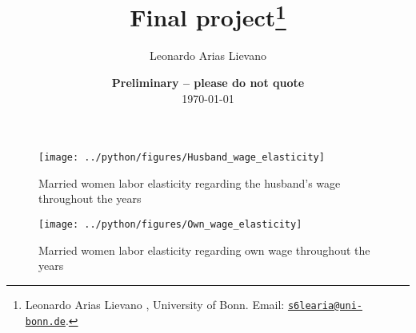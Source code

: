 \documentclass{article}
\begin{document}
\title{Final project\thanks{Leonardo Arias Lievano , University of Bonn. Email: \href{mailto:s6learia@uni-bonn.de}{\nolinkurl{s6learia@uni-bonn.de}}.}}

\author{Leonardo Arias Lievano }

\date{
    {\bf Preliminary -- please do not quote}
    \\[1ex]
    \today
}

\maketitle

\begin{table}
    
\end{table}

\begin{figure}

    \centering
    \texttt{[image: ../python/figures/Husband\_wage\_elasticity]}

    \caption{Married women labor elasticity regarding the husband's wage
    throughout the years}
    \label{fig:husband_wage}

\end{figure}

\begin{figure}

    \centering
    \texttt{[image: ../python/figures/Own\_wage\_elasticity]}

    \caption{ Married women labor elasticity regarding own wage
    throughout the years}
    \label{fig:own_wage}

\end{figure}
\end{document}
